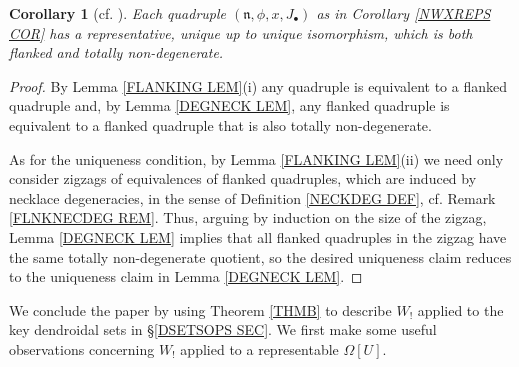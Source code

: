 \documentclass[a4paper,10pt]{article}%
\numberwithin{equation}{section}
\numberwithin{figure}{section}
\newtheorem{corollary}[equation]{Corollary}%
\theoremstyle{definition} %
\begin{document}
\begin{corollary}[{cf. \cite[Cor. 4.8]{DS11}}]
        \label{NWXREPS2_COR}
	Each quadruple $(\mathfrak{n},\phi,x,J_{\bullet})$ as in Corollary \ref{NWXREPS COR}
	has a representative, unique up to unique isomorphism,
	which is both flanked and totally non-degenerate.
\end{corollary}



\begin{proof}
	By Lemma \ref{FLANKING LEM}(i)
	any quadruple is equivalent to a flanked quadruple 
	and, by Lemma \ref{DEGNECK LEM},
	any flanked quadruple is equivalent to a flanked quadruple that is also totally non-degenerate.
	
	As for the uniqueness condition, 
	by Lemma \ref{FLANKING LEM}(ii)
	we need only consider zigzags of 
	equivalences of flanked quadruples, 
	which are induced by necklace degeneracies, 
	in the sense of Definition \ref{NECKDEG DEF},
	cf. Remark \ref{FLNKNECDEG REM}.
	Thus, arguing by induction on the size of the zigzag,
	Lemma \ref{DEGNECK LEM} implies that 
	all flanked quadruples in the zigzag have the same
	totally non-degenerate quotient,
	so the desired uniqueness claim reduces to the uniqueness claim
	in Lemma \ref{DEGNECK LEM}.
\end{proof}




We conclude the paper by using Theorem \ref{THMB}
to describe $W_!$ applied to the 
key dendroidal sets in \S \ref{DSETSOPS SEC}.
We first make some useful observations
concerning $W_!$ applied to a representable $\Omega[U]$. 
\end{document}

